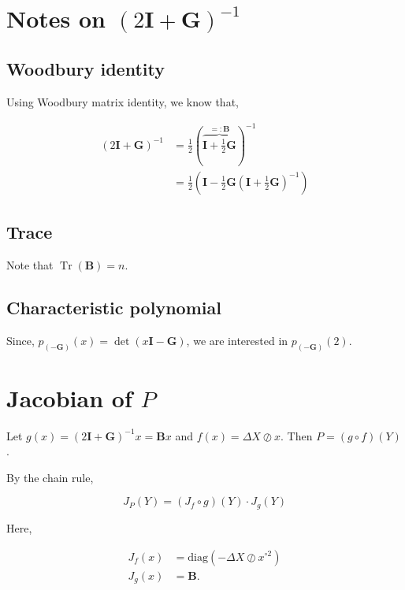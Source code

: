 \documentclass[american]{scrartcl}
\newcommand{\matr}[1]{\bm{#1}}
\DeclareMathOperator{\Tr}{Tr}
\begin{document}
\fi
\newpage
\appendix

\section{Notes on $(2\matr{I} + \matr{G})^{-1}$} \label{a:inv}
\newcommand*{\G}{\matr{G}}
\newcommand*{\I}{\matr{I}}
\newcommand*{\B}{\matr{B}}

\subsection{Woodbury identity}

Using Woodbury matrix identity, we know that,

\begin{equation}
	\begin{split}
		(2\I + \G)^{-1} &= \frac{1}{2}\left(\overbrace{\I + \frac{1}{2}\G}^{=: \B}\right)^{-1} \\
		&= \frac{1}{2} \left( \I - \frac{1}{2}\G \left(\I +\frac{1}{2}\G\right)^{-1} \right)
	\end{split}
\end{equation}

\subsection{Trace}

Note that $\Tr{(\B)} = n$.

\subsection{Characteristic polynomial}
\newcommand{\diag}{\text{diag}}

Since, $p_{(-\G)}(x) = \det{(x \I - \G)}$, we are interested in $p_{(-\G)}(2)$.

\section{Jacobian of $P$}

Let $g(x) = (2\matr{I} + \matr{G})^{-1} x = \B x$ and $f(x) = \Delta X \oslash x$. Then $P = (g \circ f)(Y)$.

By the chain rule,

\begin{equation}
	J_P(Y) = (J_f \circ g)(Y) \cdot J_g(Y)
\end{equation}

Here,

\begin{equation}
	\begin{split}
		J_f(x) &= \diag\left( - \Delta X \oslash x^{\circ 2} \right) \\
		J_g(x) &= \B.
	\end{split}
\end{equation}
\end{document}
